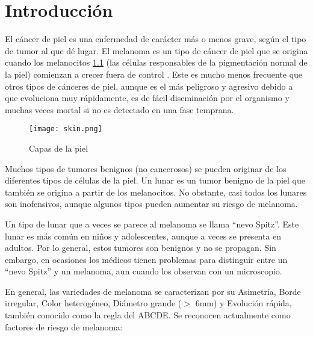\chapter{Introducción}

\ifpdf
    \graphicspath{{1_introduction/figures/PNG/}{1_introduction/figures/PDF/}{1_introduction/figures/}}
\else
    \graphicspath{{1_introduction/figures/EPS/}{1_introduction/figures/}}
\fi

El cáncer de piel es una enfermedad de carácter más o menos grave, según el tipo de tumor al que dé lugar.
El melanoma es un tipo de cáncer de piel que se origina cuando los melanocitos \ref{skin} (las células responsables de la pigmentación normal de la piel) comienzan a crecer fuera de control \cite{cancer-org}. Este es mucho menos frecuente que otros tipos de cánceres de piel, aunque es el más peligroso y agresivo debido a que evoluciona muy rápidamente, es de fácil diseminación por el organismo y muchas veces mortal si no es detectado en una fase temprana.

\begin{figure}[htbp]
    \centering
    \textbf{}\par\medskip
    \texttt{[image: skin.png]}
    \caption{Capas de la piel \cite{cancer-org}}
    \label{skin}
\end{figure}

Muchos tipos de tumores benignos (no cancerosos) se pueden originar de los diferentes tipos de células de la piel. Un lunar es un tumor benigno de la piel que también se origina a partir de los melanocitos. No obstante, casi todos los lunares son inofensivos, aunque algunos tipos pueden aumentar su riesgo de melanoma. 

Un tipo de lunar que a veces se parece al melanoma se llama “nevo Spitz”. Este lunar es más común en niños y adolescentes, aunque a veces se presenta en adultos. Por lo general, estos tumores son benignos y no se propagan. Sin embargo, en ocasiones los médicos tienen problemas para distinguir entre un “nevo Spitz” y un melanoma, aun cuando los observan con un microscopio.

\newpage

En general, las variedades de melanoma se caracterizan por su Asimetría, Borde irregular, Color heterogéneo, Diámetro grande ($>$ 6mm) y Evolución rápida, también conocido como la regla del ABCDE.
Se reconocen actualmente como factores de riesgo de melanoma:

